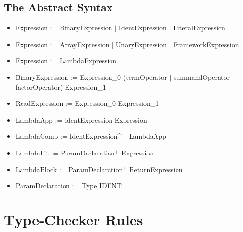 \subsection{The Abstract Syntax}

\begin{itemize}
	\item Expression := BinaryExpression $|$ IdentExpression $|$ LiteralExpression
	\item Expression := ArrayExpression $|$ UnaryExpression $|$ FrameworkExpression
	\item Expression := LambdaExpression
	\item BinaryExpression := Expression_0 (termOperator $|$ summandOperator $|$ factorOperator) Expression_1
	\item ReadExpression := Expression_0 Expression_1
	\item LambdaApp := IdentExpression Expression
	\item LambdaComp := IdentExpression^+ LambdaApp
	\item LambdaLit := ParamDeclaration$^+$ Expression
	\item LambdaBlock := ParamDeclaration$^+$ ReturnExpression
	\item ParamDeclaration := Type IDENT
\end{itemize}

\section{Type-Checker Rules}

